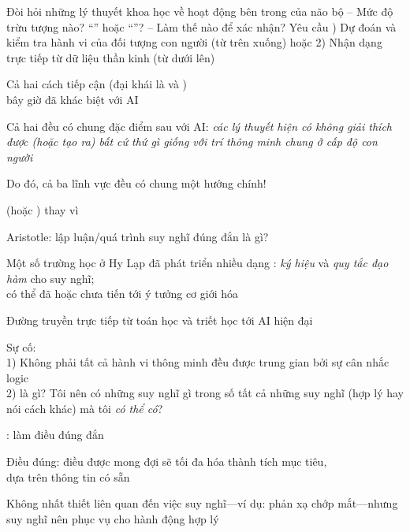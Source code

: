 \documentclass{article}
\begin{document}
\begin{huge}
Đòi hỏi những lý thuyết khoa học về hoạt động bên trong của não bộ\al
 -- Mức độ trừu tượng nào? ``'' hoặc ``''?\al
 -- Làm thế nào để xác nhận? Yêu cầu ) Dự đoán và kiểm tra hành vi của đối tượng con người (từ trên xuống)\nl
    hoặc 2) Nhận dạng trực tiếp từ dữ liệu thần kinh (từ dưới lên)

Cả hai cách tiếp cận (đại khái là  và ) \\
bây giờ đã khác biệt với AI

Cả hai đều có chung đặc điểm sau với AI:\al
   \emph{các lý thuyết hiện có không giải thích được (hoặc tạo ra)\al
   bất cứ thứ gì giống với trí thông minh chung ở cấp độ con người }

Do đó, cả ba lĩnh vực đều có chung một hướng chính!




 (hoặc ) thay vì 

Aristotle: lập luận/quá trình suy nghĩ đúng đắn là gì?

Một số trường học ở Hy Lạp đã phát triển nhiều dạng :\al
   \emph{ký hiệu} và \emph{quy tắc đạo hàm} cho suy nghĩ;\\
có thể đã hoặc chưa tiến tới ý tưởng cơ giới hóa

Đường truyền trực tiếp từ toán học và triết học tới AI hiện đại

Sự cố: \\
1) Không phải tất cả hành vi thông minh đều được trung gian bởi sự cân nhắc logic\\
2)  là gì? Tôi nên có những suy nghĩ gì \emph{} \al
   trong số tất cả những suy nghĩ (hợp lý hay nói cách khác) mà tôi \emph{có thể có}?




: làm điều đúng đắn

Điều đúng: điều được mong đợi sẽ tối đa hóa thành tích mục tiêu,\\
dựa trên thông tin có sẵn

Không nhất thiết liên quan đến việc suy nghĩ---ví dụ: phản xạ chớp mắt---nhưng\\
suy nghĩ nên phục vụ cho hành động hợp lý


\end{huge}
\end{document}

